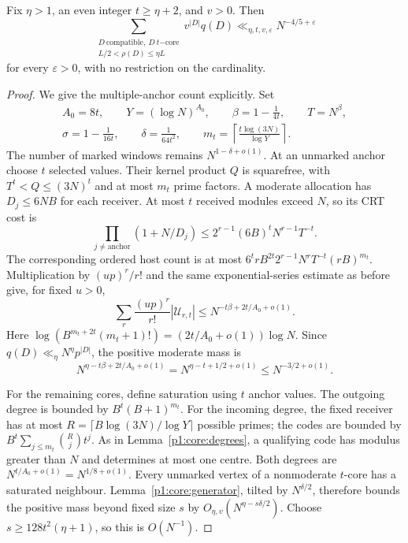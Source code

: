 \begin{proposition}
\label{p1:core:positive-core}
Fix $\eta>1$, an even integer $t\ge\eta+2$, and $v>0$. Then
\begin{equation}
 \sum_{\substack{D\ \mathrm{compatible},\ D\ t\mathrm{-core}\\
                  L/2<\rho(D)\le\eta L}}
 v^{|D|}q(D)\ll_{\eta,t,v,\varepsilon}N^{-4/5+\varepsilon}
 \label{p1:core:positive-core-bound}
\end{equation}
for every $\varepsilon>0$, with no restriction on the cardinality.
\end{proposition}
\begin{proof}
We give the multiple-anchor count explicitly. Set
\[
\begin{gathered}
 A_0=8t,\qquad Y=(\log N)^{A_0},\qquad
 \beta=1-\frac1{4t},\qquad T=N^\beta,\\
 \sigma=1-\frac1{16t},\qquad\delta=\frac1{64t^2},\qquad
 m_t=\left\lceil\frac{t\log(3N)}{\log Y}\right\rceil.
\end{gathered}
\]
The number of marked windows remains $N^{1-\delta+o(1)}$.
At an unmarked anchor choose $t$ selected values. Their kernel
product $Q$ is squarefree, with $T^t<Q\le(3N)^t$ and at most $m_t$
prime factors. A moderate allocation has $D_j\le6NB$ for each
receiver. At most $t$ received modules exceed $N$, so its CRT cost is
\[
 \prod_{j\ne\mathrm{anchor}}(1+N/D_j)
 \le2^{r-1}(6B)^tN^{r-1}T^{-t}.
\]
The corresponding ordered host count is at most
$6^t rB^{2t}2^{r-1}N^rT^{-t}(rB)^{m_t}$.
Multiplication by $(up)^r/r!$ and the same exponential-series
estimate as before give, for fixed $u>0$,
\[
 \sum_r\frac{(up)^r}{r!}|\mathcal U_{r,t}|
 \le N^{-t\beta+2t/A_0+o(1)}.
\]
Here $\log(B^{m_t+2t}(m_t+1)!)=(2t/A_0+o(1))\log N$.
Since $q(D)\ll_\eta N^\eta p^{|D|}$, the positive moderate mass is
\begin{equation}
 N^{\eta-t\beta+2t/A_0+o(1)}
       =N^{\eta-t+1/2+o(1)}\le N^{-3/2+o(1)}.
 \label{p1:core:multi-anchor-gain}
\end{equation}

For the remaining cores, define saturation using $t$ anchor values.
The outgoing degree is bounded by $B^t(B+1)^{m_t}$. For the incoming
degree, the fixed receiver has at most
$R=\lceil B\log(3N)/\log Y\rceil$ possible primes; the codes are
bounded by
$B^t\sum_{j\le m_t}\binom Rj t^j$.
As in Lemma~\ref{p1:core:degrees}, a qualifying code has modulus
greater than $N$ and determines at most one centre. Both degrees are
$N^{t/A_0+o(1)}=N^{1/8+o(1)}$.
Every unmarked vertex of a nonmoderate $t$-core has a saturated
neighbour. Lemma~\ref{p1:core:generator}, tilted by $N^{\delta/2}$,
therefore bounds the positive mass beyond fixed size $s$ by
$O_{\eta,v}(N^{\eta-s\delta/2})$.
Choose $s\ge128t^2(\eta+1)$, so this is $O(N^{-1})$.


\end{proof}
